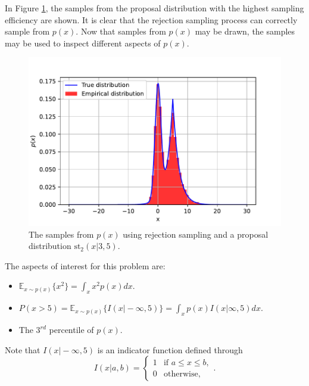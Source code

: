 \documentclass{article}
\begin{document}
	In Figure \ref{fig:Q1_rejection_sampling_samples}, the samples from the proposal distribution with the highest sampling efficiency are shown. It is clear that the rejection sampling process can correctly sample from $p(x)$. Now that samples from $p(x)$ may be drawn, the samples may be used to inspect different aspects of $p(x)$. 
	\begin{figure}[htb!]
		\centering
		\includegraphics[scale=0.7]{Q1c_2.pdf}
		\caption{The samples from $p(x)$ using rejection sampling and a proposal distribution $\text{st}_{2}(x \vert 3, 5)$. }
		\label{fig:Q1_rejection_sampling_samples}
	\end{figure}

	The aspects of interest for this problem are:
	\begin{itemize}
		\item $\mathbb{E}_{x \sim p(x)} \{ x^2 \} = \int_x x^2 p(x)dx$.
		\item $P(x > 5) = \mathbb{E}_{x \sim p(x)} \{ I(x \vert -\infty, 5) \} = \int_x p(x)I(x \vert \infty, 5)dx$.
		\item The $3^{rd}$ percentile of $p(x)$. 
	\end{itemize}
	
	Note that $I(x \vert -\infty, 5)$ is an indicator function defined through
	\begin{equation}
		I(x \vert a, b) = \begin{cases} 
			1 & \text{if }  a \leq x \leq b, \\
			0 & \text{otherwise,}
		\end{cases}.
	\end{equation}
\end{document}
